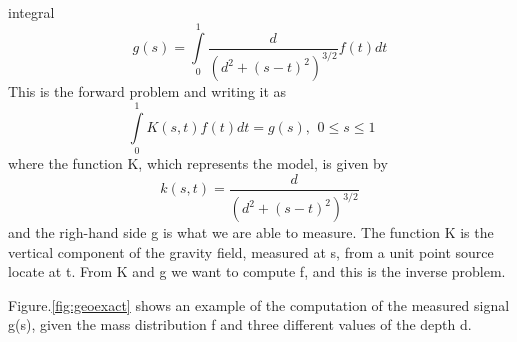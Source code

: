 \documentclass{article}
\begin{document}
integral
\[g(s) = \int\limits_0^1 {\frac{d}{{{{({d^2} + {{(s - t)}^2})}^{3/2}}}}f(t)dt}
\]
This is the forward problem and writing it as
\begin{equation}
\int\limits_0^1 {K(s,t)f(t)dt = g(s),\begin{array}{*{20}{c}}
{0 \le s \le 1}&{}
\end{array}}
\label{eq:integralequation}
\end{equation}
where the function K, which represents the model, is given by
\begin{equation}
k(s,t) = \frac{d}{{{{({d^2} + {{(s - t)}^2})}^{3/2}}}}
\end{equation}
and the righ-hand side g is what we are able to measure. The function K is the
vertical component of the gravity field, measured at s, from a unit point source
locate at t. From K and g we want to compute f, and this is the inverse problem.

Figure.\ref{fig:geoexact} shows an example of the computation of the measured
signal g(s), given the mass distribution f and three different values of the
depth d.
\end{document}
